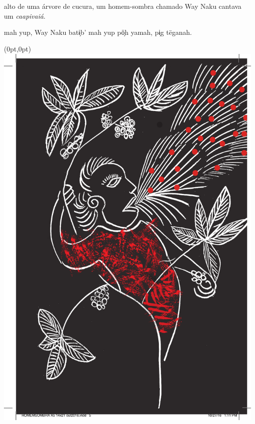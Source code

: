 \chapter*{}
\mbox{}\vspace*{\fill}

\begingroup\raggedright\setlength{\linewidth}{.6\linewidth}


 alto de uma árvore de
cucura, um homem-sombra
chamado Way Naku cantava
um \textit{caapivaiá}.

\vspace{2em}

 mah yup, Way Naku
batɨ̗b’ mah yup pö̗h yamah,
pɨ̗g tëganah.

\vspace*{\fill}

\pagebreak

\begin{textblock*}{8in}(0pt,0pt)%
\vspace*{-2.8cm}
\hspace*{-3.2cm}\includegraphics[width=153mm]{./imgs/img1.pdf}
\end{textblock*}

